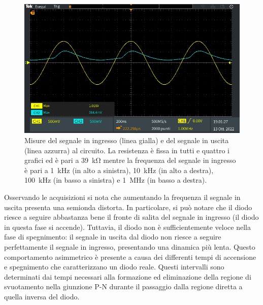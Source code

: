 \begin{figure}[b]
\begin{minipage}{.496\textwidth}
	\end{minipage}
	\begin{minipage}{.496\textwidth}
		\includegraphics[width=\linewidth]{./ImageFiles/Laboratorio 2/TEK00014.PNG}
	\end{minipage}
	\caption{Misure del segnale in ingresso (linea gialla) e del segnale in uscita (linea azzurra) al circuito. La resistenza è fissa in tutti e quattro i grafici ed è pari a \SI{39}{\kilo\ohm} mentre la frequenza del segnale in ingresso è pari a \SI{1}{\kilo\hertz} (in alto a sinistra), \SI{10}{\kilo\hertz} (in alto a destra), \SI{100}{\kilo\hertz} (in basso a sinistra) e \SI{1}{\mega\hertz} (in basso a destra).}
	\label{fig:freqwith38}
\end{figure}
Osservando le acquisizioni si nota che aumentando la frequenza il segnale in uscita presenta una semionda distorta. In particolare, si può notare che il diodo riesce a seguire abbastanza bene il fronte di salita del segnale in ingresso (il diodo in questa fase si accende). Tuttavia, il diodo non è sufficientemente veloce nella fase di spegnimento: il segnale in uscita dal diodo non riesce a seguire perfettamente il segnale in ingresso, presentando una dinamica più lenta. Questo comportamento asimmetrico è presente a causa dei differenti tempi di accensione e spegnimento che caratterizzano un diodo reale. Questi intervalli sono determinati dai tempi necessari alla formazione ed eliminazione della regione di svuotamento nella giunzione P-N durante il passaggio dalla regione diretta a quella inversa del diodo.  

\clearpage


